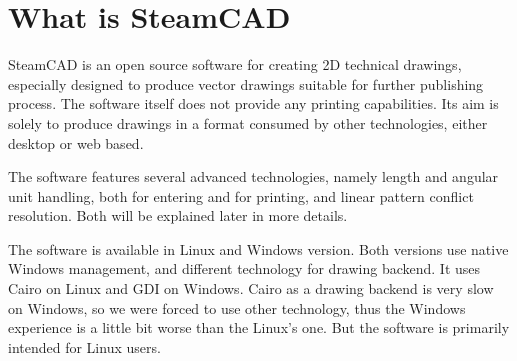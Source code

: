 \pagestyle{empty}
\begin{center}
\vspace*{-2cm}
\end{center}

\pagestyle{headings}

\section{What is SteamCAD}

SteamCAD is an open source software for creating 2D technical drawings, especially designed to 
produce vector drawings suitable for further publishing process. The software itself does not
provide any printing capabilities. Its aim is solely to produce drawings in a format consumed
by other technologies, either desktop or web based.

The software features several advanced technologies, namely length and angular unit handling, both
for entering and for printing, and linear pattern conflict resolution. Both will be explained
later in more details.

The software is available in Linux and Windows version. Both versions use native Windows
management, and different technology for drawing backend. It uses Cairo on Linux and GDI on
Windows. Cairo as a drawing backend is very slow on Windows, so we were forced to use other
technology, thus the Windows experience is a little bit worse than the Linux's one. But the
software is primarily intended for Linux users.

